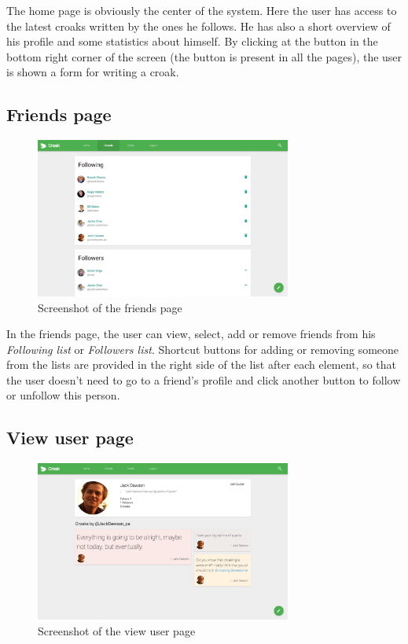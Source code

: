 \documentclass[paper=a4, fontsize=12pt]{scrartcl}
\numberwithin{equation}{section}    %
\numberwithin{figure}{section}      %
\numberwithin{table}{section}        %
\begin{document}
The home page is obviously the center of the system. Here the user has access to the latest
croaks written by the ones he follows. He has also a short overview of his profile
and some statistics about himself. By clicking at the button in the bottom right corner
of the screen (the button is present in all the pages), the user is shown a form for writing a croak.

\subsection{Friends page}
\begin{figure}[H]
  \begin{center}
    \includegraphics[width=0.75\textwidth]{screenshots/friends}
  \end{center}
  \caption{Screenshot of the friends page}
\end{figure}

In the friends page, the user can view, select, add or remove friends from his \emph{Following list}
or \emph{Followers list}. Shortcut buttons for adding or removing someone from the lists
are provided in the right side of the list after each element, so that the user doesn't
need to go to a friend's profile and click another button to follow or unfollow this person.

\subsection{View user page}
\begin{figure}[H]
  \begin{center}
    \includegraphics[width=0.75\textwidth]{screenshots/viewuser}
  \end{center}
  \caption{Screenshot of the view user page}
\end{figure}
\end{document}
